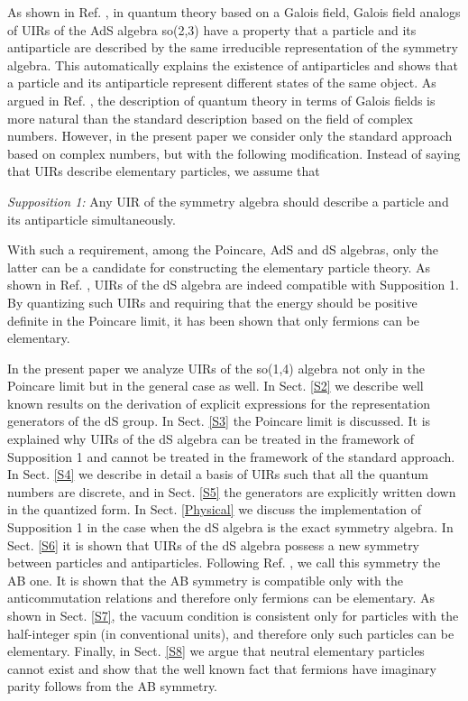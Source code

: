 \documentclass[a4paper,12pt]{article}%
\begin{document}
As shown in Ref. \cite{lev2}, in 
quantum theory based on a Galois field, Galois field analogs
of UIRs of the AdS algebra so(2,3) have a property 
that a particle and 
its antiparticle are described by the same irreducible
representation of the symmetry algebra. This automatically 
explains the existence of antiparticles and shows that a 
particle and its antiparticle represent different states of 
the same object. 
As argued in Ref. \cite{lev2}, 
the description of quantum theory in terms of Galois fields
is more natural than the standard description based on the
field of complex numbers. However, in the present paper we
consider only the standard approach based on complex numbers,
but with the following 
modification. Instead of saying that UIRs 
describe elementary particles, we assume that

{\it Supposition 1:} Any UIR of the symmetry algebra should 
describe a particle and its antiparticle simultaneously.

With such a requirement, among the Poincare, AdS and dS
algebras, only the latter can be a candidate for 
constructing the
elementary particle theory. As shown in Ref. \cite{hep}, 
UIRs of the dS algebra are indeed compatible with Supposition 1. 
By quantizing such UIRs and requiring that the energy should be
positive definite in the Poincare limit, it has been shown 
that only fermions can be elementary. 

In the present paper we analyze UIRs of the so(1,4) algebra
not only in the Poincare limit but in the general case
as well.
In Sect. \ref{S2} we describe well known results on the
derivation of explicit expressions for the representation
generators of the dS group. In Sect. \ref{S3} the
Poincare limit is discussed. It is explained why UIRs
of the dS algebra can be treated in the framework of
Supposition 1 and cannot be treated in the framework of
the standard approach. In Sect. \ref{S4} we describe in
detail a basis of UIRs such that all the quantum numbers
are discrete, and in Sect. \ref{S5} the generators are
explicitly written down in the quantized form. 
In Sect. \ref{Physical} we discuss the implementation
of Supposition 1 in
the case when the dS algebra is the exact symmetry algebra.
In Sect. \ref{S6} it is shown that UIRs of the dS algebra
possess a new symmetry between particles and 
antiparticles. Following Ref. \cite{lev2}, we call this
symmetry the AB one. It is shown that the AB symmetry
is compatible only with the anticommutation relations
and therefore only fermions can be elementary. As
shown in Sect. \ref{S7}, the vacuum condition is
consistent only for particles with the half-integer
spin (in conventional units), and therefore only such
particles can be elementary. Finally, in Sect. \ref{S8}
we argue that neutral elementary particles cannot
exist and show that the well known fact that fermions
have imaginary parity follows from the AB symmetry. 
\end{document}
